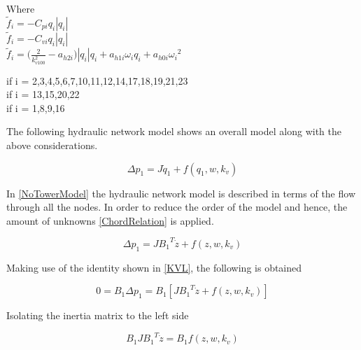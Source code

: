 \begin{minipage}[t]{0.20\textwidth}
Where\\
\hspace*{2mm} $\tilde{f}_i = -C_{pi} q_i |q_i|$  \\
\hspace*{2mm} $\tilde{f}_i = -C_{vi} q_i |q_i|$  \\
\hspace*{2mm} $\tilde{f}_i = \Big(\frac{2}{k_{v100}^2} - a_{h2i}\Big)|q_i| q_i  + a_{h1i} \omega_{i} q_i + a_{h0i}{\omega_i}^2$  
\end{minipage}
\begin{minipage}[t]{0.68\textwidth}
\vspace*{2mm}
\hspace*{25mm} if i = 2,3,4,5,6,7,10,11,12,14,17,18,19,21,23\\
\hspace*{25mm} if i = 13,15,20,22						   \\
\hspace*{65mm} if i = 1,8,9,16						   
\end{minipage}


The following hydraulic network model shows an overall model along with the above considerations. 

\begin{equation}
  \Delta p_1 = J \dot{q}_1 + f(q_1, w, k_v)
  \label{NoTowerModel}
\end{equation}

In \eqref{NoTowerModel} the hydraulic network model is described in terms of the 
flow through all the nodes. In order to reduce the order of the model and hence, 
the amount of unknowns \eqref{ChordRelation} is applied. 

\begin{equation}
  \Delta p_1 = J {B_1}^T \dot{z} + f(z, w, k_v)
  \label{ChordsModel}
\end{equation}

Making use of the identity shown in \eqref{KVL}, the following is obtained

\begin{equation}
  0 = B_1 \Delta p_1 = B_1 [J {B_1}^T \dot{z} + f(z, w, k_v)] 
 \end{equation}

Isolating the inertia matrix to the left side

\begin{equation}
  B_1 J {B_1}^T \dot{z}  = B_1 f(z, w, k_v)
 \end{equation}

